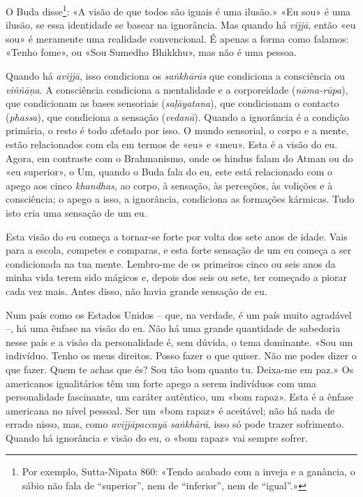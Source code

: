 
O Buda disse\footnote{Por exemplo, Sutta-Nipata 860: «Tendo acabado com a
  inveja e a ganância, o sábio não fala de ``superior'', nem de ``inferior'',
  nem de ``igual''.»}: «A visão de que todos são iguais é uma ilusão.» «Eu sou»
é uma ilusão, se essa identidade se basear na ignorância. Mas quando há
\emph{vijjā}, então «eu sou» é meramente uma realidade convencional. É apenas a
forma como falamos: «Tenho fome», ou «Sou Sumedho Bhikkhu», mas não é uma
pessoa.

Quando há \emph{avijjā}, isso condiciona os \emph{saṅkhārās} que condiciona a
consciência ou \emph{viññāṇa}. A consciência condiciona a mentalidade e a
corporeidade (\emph{nāma-rūpa}), que condicionam as bases sensoriais
(\emph{saḷāyatana}), que condicionam o contacto (\emph{phassa}), que condiciona
a sensação (\emph{vedanā}). Quando a ignorância é a condição primária, o resto é
todo afetado por isso. O mundo sensorial, o corpo e a mente, estão relacionados
com ela em termos de «eu» e «meu». Esta é a visão do eu. Agora, em contraste com
o Brahmanismo, onde os hindus falam do Atman ou do «eu superior», o Um, quando o
Buda fala do eu, este está relacionado com o apego aos cinco \emph{khandhas}, ao
corpo, à sensação, às perceções, às volições e à consciência; o apego a isso, a
ignorância, condiciona as formações kármicas. Tudo isto cria uma sensação de um
eu.

Esta visão do eu começa a tornar-se forte por volta dos sete anos de idade.
Vais para a escola, competes e comparas, e esta forte sensação de um eu começa a
ser condicionada na tua mente. Lembro-me de os primeiros cinco ou seis anos da
minha vida terem sido mágicos e, depois dos seis ou sete, ter começado a piorar
cada vez mais. Antes disso, não havia grande sensação de eu.

Num país como os Estados Unidos -- que, na verdade, é um país muito agradável
--, há uma ênfase na visão do eu. Não há uma grande quantidade de sabedoria
nesse país e a visão da personalidade é, sem dúvida, o tema dominante. «Sou um
indivíduo. Tenho os meus direitos. Posso fazer o que quiser. Não me podes dizer
o que fazer. Quem te achas que és? Sou tão bom quanto tu. Deixa-me em paz.» Os
americanos igualitários têm um forte apego a serem indivíduos com uma
personalidade fascinante, um caráter autêntico, um «bom rapaz». Esta é a ênfase
americana no nível pessoal. Ser um «bom rapaz» é aceitável; não há nada de
errado nisso, mas, como \emph{avijjāpaccayā saṅkhārā}, isso só pode trazer
sofrimento. Quando há ignorância e visão do eu, o «bom rapaz» vai sempre sofrer.

